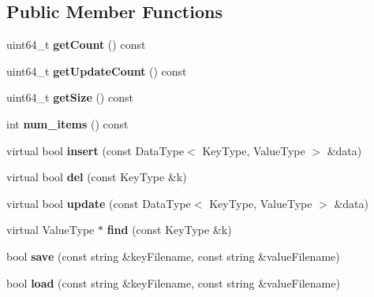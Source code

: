 \subsection*{Public Member Functions}
\begin{CompactItemize}
\item 
\hypertarget{classDynamicPerfectHash_44a2a7c85a12a289c7a4dd95f6015dcc}{
uint64\_\-t \textbf{getCount} () const }
\label{classDynamicPerfectHash_44a2a7c85a12a289c7a4dd95f6015dcc}

\item 
\hypertarget{classDynamicPerfectHash_91faaff3f185c4f3d53cc171bd8fa3b5}{
uint64\_\-t \textbf{getUpdateCount} () const }
\label{classDynamicPerfectHash_91faaff3f185c4f3d53cc171bd8fa3b5}

\item 
\hypertarget{classDynamicPerfectHash_0ca61689fdfb18bf09b41bffa6d16e88}{
uint64\_\-t \textbf{getSize} () const }
\label{classDynamicPerfectHash_0ca61689fdfb18bf09b41bffa6d16e88}

\item 
\hypertarget{classDynamicPerfectHash_0466dae3d7383a7e9e5e36611be3812c}{
int \textbf{num\_\-items} () const }
\label{classDynamicPerfectHash_0466dae3d7383a7e9e5e36611be3812c}

\item 
\hypertarget{classDynamicPerfectHash_baf17e446835263f2e4ee9b85540b11f}{
virtual bool \textbf{insert} (const DataType$<$ KeyType, ValueType $>$ \&data)}
\label{classDynamicPerfectHash_baf17e446835263f2e4ee9b85540b11f}

\item 
\hypertarget{classDynamicPerfectHash_e5d36461bb755c4971870ae224e503e8}{
virtual bool \textbf{del} (const KeyType \&k)}
\label{classDynamicPerfectHash_e5d36461bb755c4971870ae224e503e8}

\item 
\hypertarget{classDynamicPerfectHash_27e311e5de18c173418035a62af293f6}{
virtual bool \textbf{update} (const DataType$<$ KeyType, ValueType $>$ \&data)}
\label{classDynamicPerfectHash_27e311e5de18c173418035a62af293f6}

\item 
\hypertarget{classDynamicPerfectHash_4d0d30a7c94465c9b154cfcfc1c951cb}{
virtual ValueType $\ast$ \textbf{find} (const KeyType \&k)}
\label{classDynamicPerfectHash_4d0d30a7c94465c9b154cfcfc1c951cb}

\item 
\hypertarget{classDynamicPerfectHash_162ff9621e8994cc5f270da673f329c8}{
bool \textbf{save} (const string \&keyFilename, const string \&valueFilename)}
\label{classDynamicPerfectHash_162ff9621e8994cc5f270da673f329c8}

\item 
\hypertarget{classDynamicPerfectHash_6127d9f252d609eff5b9b2da42efba40}{
bool \textbf{load} (const string \&keyFilename, const string \&valueFilename)}
\label{classDynamicPerfectHash_6127d9f252d609eff5b9b2da42efba40}

\end{CompactItemize}
